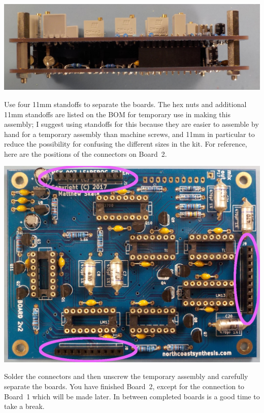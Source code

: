 \noindent\includegraphics[width=\linewidth]{board23-stack.jpg}

Use four 11mm standoffs to separate the boards.  The hex nuts and additional
11mm standoffs are listed on the BOM for temporary use in making this
assembly; I suggest using standoffs for this because they are easier to
assemble by hand for a temporary assembly than machine screws, and 11mm in
particular to reduce the possibility for confusing the different sizes in
the kit.  For reference, here are the positions of the connectors on Board~2.

\noindent\includegraphics[width=\linewidth]{10x1-2.jpg}

Solder the connectors and then unscrew the temporary assembly and carefully
separate the boards.  You have finished Board~2, except for the connection
to Board~1 which will be made later.  In between completed boards is a good
time to take a break.
